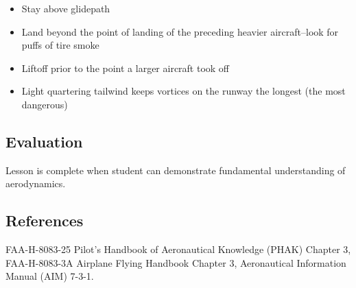 \begin{itemize}
  \item Stay above glidepath

  \item Land beyond the point of landing of the preceding heavier aircraft--look
    for puffs of tire smoke

  \item Liftoff prior to the point a larger aircraft took off

  \item Light quartering tailwind keeps vortices on the runway the longest (the
    most dangerous)
\end{itemize}

\subsection{Evaluation}

Lesson is complete when student can demonstrate fundamental understanding of
aerodynamics.

\subsection{References}

FAA-H-8083-25 Pilot's Handbook of Aeronautical Knowledge (PHAK) Chapter 3,
FAA-H-8083-3A Airplane Flying Handbook Chapter 3, Aeronautical Information
Manual (AIM) 7-3-1.

